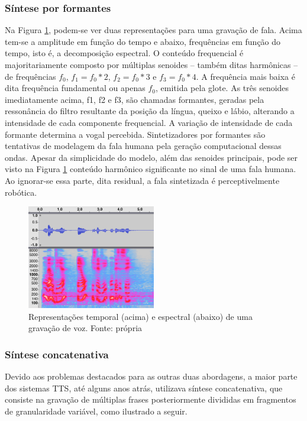 \subsubsection{Síntese por formantes}
\label{formant}
Na Figura \ref{fig:spectrum}, podem-se ver duas representações para uma gravação de
fala. Acima tem-se a amplitude em função do tempo e abaixo, frequências em
função do tempo, isto é, a decomposição espectral. O conteúdo frequencial é
majoritariamente composto por múltiplas senoides -- também ditas harmônicas --
de frequências $ f_0 $, $ f_1 = f_0 * 2 $, $ f_2 = f_0 * 3 $ e $ f_3 = f_0 * 4
$. A frequência mais baixa é dita frequência fundamental ou apenas $ f_0 $,
emitida pela glote. As três senoides imediatamente acima, f1, f2 e f3, são
chamadas formantes, geradas pela ressonância do filtro resultante da posição da
língua, queixo e lábio, alterando a intensidade de cada componente frequencial.
A variação de intensidade de cada formante determina a vogal percebida.
Sintetizadores por formantes são tentativas de modelagem da fala humana pela
geração computacional dessas ondas. Apesar da simplicidade do modelo, além das
senoides principais, pode ser visto na Figura \ref{fig:spectrum} conteúdo
harmônico significante no sinal de uma fala humana.  Ao ignorar-se essa parte,
dita residual, a fala sintetizada é perceptivelmente robótica.

\begin{figure}
  \centering
    \includegraphics[width=0.5\textwidth]{Imagens/espectro.png}
  \caption[Representações temporal e espectral de uma gravação de voz]{Representações temporal (acima) e espectral (abaixo) de uma gravação de voz. Fonte: própria}
  \label{fig:spectrum}
\end{figure}


\subsubsection{Síntese concatenativa}
Devido aos problemas destacados para as outras duas abordagens, a maior parte
dos sistemas TTS, até alguns anos atrás, utilizava síntese concatenativa, que
consiste na gravação de múltiplas frases posteriormente divididas
em fragmentos de granularidade variável, como ilustrado a seguir.


